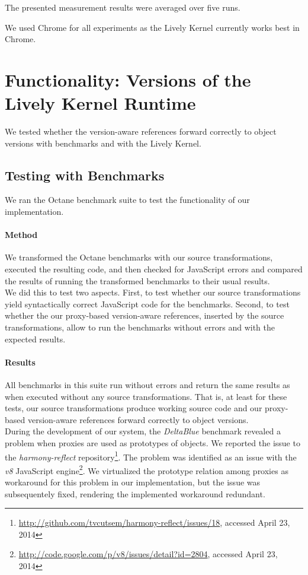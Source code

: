 The presented measurement results were averaged over five runs.

We used Chrome for all experiments as the Lively Kernel currently works best in Chrome.



\section{Functionality: Versions of the Lively Kernel Runtime} \label{sec:EVALUATION:2}

We tested whether the version-aware references forward correctly to object versions with benchmarks and with the Lively Kernel.

\subsection{Testing with Benchmarks}

We ran the Octane benchmark suite to test the functionality of our implementation.

\paragraph{Method}
We transformed the Octane benchmarks with our source transformations, executed the resulting code, and then checked for JavaScript errors and compared the results of running the transformed benchmarks to their usual results.\\
We did this to test two aspects.
First, to test whether our source transformations yield syntactically correct JavaScript code for the benchmarks.
Second, to test whether the our proxy-based version-aware references, inserted by the source transformations, allow to run the benchmarks without errors and with the expected results.


\paragraph{Results}
All benchmarks in this suite run without errors and return the same results as when executed without any source transformations.
That is, at least for these tests, our source transformations produce working source code and our proxy-based version-aware references forward correctly to object versions.\\
During the development of our system, the \emph{DeltaBlue} benchmark revealed a problem when proxies are used as prototypes of objects.
We reported the issue to the \emph{harmony-reflect} repository\footnote{\url{http://github.com/tvcutsem/harmony-reflect/issues/18}, accessed April 23, 2014}.
The problem was identified as an issue with the \emph{v8} JavaScript engine\footnote{\url{http://code.google.com/p/v8/issues/detail?id=2804}, accessed April 23, 2014}.
We virtualized the prototype relation among proxies as workaround for this problem in our implementation, but the issue was subsequentely fixed, rendering the implemented workaround redundant.

